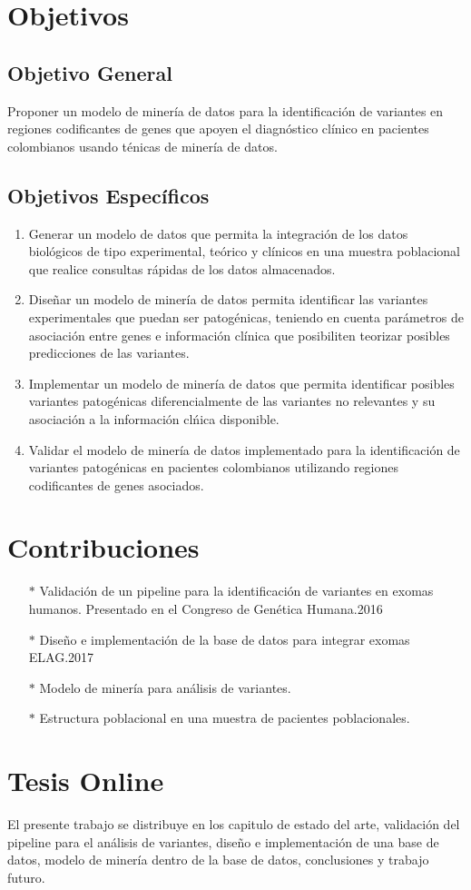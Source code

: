 \section*{Objetivos}

\subsection*{Objetivo General}%

Proponer un modelo de miner\'ia de datos para la identificaci\'on de variantes en regiones codificantes de genes  que apoyen el  diagn\'ostico cl\'inico en pacientes colombianos usando t\'enicas de miner\'ia de datos.


\subsection*{Objetivos Espec\'ificos}

\begin{enumerate}
	\item Generar un modelo de datos que permita la integraci\'on de los datos biol\'ogicos de tipo experimental, te\'orico y cl\'inicos en una  muestra poblacional que realice consultas r\'apidas de los datos almacenados.
	\item Dise\~nar un modelo de miner\'ia de datos permita identificar las variantes experimentales que puedan ser patog\'enicas, teniendo en cuenta par\'ametros de asociaci\'on entre genes e informaci\'on cl\'inica que posibiliten teorizar posibles predicciones de las variantes. 
	\item Implementar un  modelo de miner\'ia de datos que permita identificar posibles variantes patog\'enicas diferencialmente de las variantes no relevantes y  su asociaci\'on a la informaci\'on cl\'nica disponible.
	\item Validar el modelo de miner\'ia de datos implementado para la identificaci\'on de variantes patog\'enicas en pacientes colombianos utilizando regiones codificantes de genes asociados.  
\end{enumerate}

\section*{Contribuciones}

\begin{itemize}
	\item[$*$] Validación de un pipeline para la identificación de variantes en exomas humanos. Presentado en el Congreso de Genética Humana.2016
	\item[$*$] Diseño e implementación de la base de datos para integrar exomas ELAG.2017
	\item[$*$] Modelo de minería para análisis de variantes.
	\item[$*$] Estructura poblacional en una muestra de pacientes poblacionales.
\end{itemize}

\section*{Tesis Online}

El presente trabajo se distribuye en los capitulo de estado del arte, validación del pipeline para el análisis de variantes, diseño e implementación de una base de datos, modelo de minería dentro de la base de datos, conclusiones y trabajo futuro.

